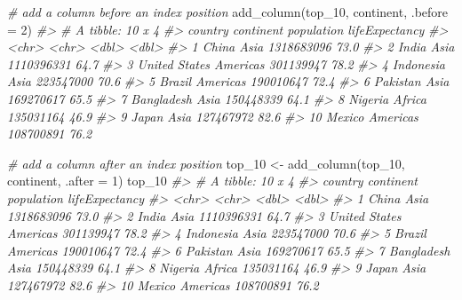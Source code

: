 \documentclass[
]{book}
\newenvironment{Shaded}{\begin{snugshade}}{\end{snugshade}}
\newcommand{\AttributeTok}[1]{\textcolor[rgb]{0.77,0.63,0.00}{#1}}
\newcommand{\CommentTok}[1]{\textcolor[rgb]{0.56,0.35,0.01}{\textit{#1}}}
\newcommand{\DecValTok}[1]{\textcolor[rgb]{0.00,0.00,0.81}{#1}}
\newcommand{\FunctionTok}[1]{\textcolor[rgb]{0.00,0.00,0.00}{#1}}
\newcommand{\NormalTok}[1]{#1}
\newcommand{\OtherTok}[1]{\textcolor[rgb]{0.56,0.35,0.01}{#1}}
\begin{document}
\begin{Shaded}
\begin{Highlighting}[]
\CommentTok{\# add a column before an index position}
\FunctionTok{add\_column}\NormalTok{(top\_10, continent, }\AttributeTok{.before =} \DecValTok{2}\NormalTok{)}
\CommentTok{\#\textgreater{} \# A tibble: 10 x 4}
\CommentTok{\#\textgreater{}    country       continent population lifeExpectancy}
\CommentTok{\#\textgreater{}    \textless{}chr\textgreater{}         \textless{}chr\textgreater{}          \textless{}dbl\textgreater{}          \textless{}dbl\textgreater{}}
\CommentTok{\#\textgreater{}  1 China         Asia      1318683096           73.0}
\CommentTok{\#\textgreater{}  2 India         Asia      1110396331           64.7}
\CommentTok{\#\textgreater{}  3 United States Americas   301139947           78.2}
\CommentTok{\#\textgreater{}  4 Indonesia     Asia       223547000           70.6}
\CommentTok{\#\textgreater{}  5 Brazil        Americas   190010647           72.4}
\CommentTok{\#\textgreater{}  6 Pakistan      Asia       169270617           65.5}
\CommentTok{\#\textgreater{}  7 Bangladesh    Asia       150448339           64.1}
\CommentTok{\#\textgreater{}  8 Nigeria       Africa     135031164           46.9}
\CommentTok{\#\textgreater{}  9 Japan         Asia       127467972           82.6}
\CommentTok{\#\textgreater{} 10 Mexico        Americas   108700891           76.2}

\CommentTok{\# add a column after an index position}
\NormalTok{top\_10 }\OtherTok{\textless{}{-}} \FunctionTok{add\_column}\NormalTok{(top\_10, continent, }\AttributeTok{.after =} \DecValTok{1}\NormalTok{)}
\NormalTok{top\_10}
\CommentTok{\#\textgreater{} \# A tibble: 10 x 4}
\CommentTok{\#\textgreater{}    country       continent population lifeExpectancy}
\CommentTok{\#\textgreater{}    \textless{}chr\textgreater{}         \textless{}chr\textgreater{}          \textless{}dbl\textgreater{}          \textless{}dbl\textgreater{}}
\CommentTok{\#\textgreater{}  1 China         Asia      1318683096           73.0}
\CommentTok{\#\textgreater{}  2 India         Asia      1110396331           64.7}
\CommentTok{\#\textgreater{}  3 United States Americas   301139947           78.2}
\CommentTok{\#\textgreater{}  4 Indonesia     Asia       223547000           70.6}
\CommentTok{\#\textgreater{}  5 Brazil        Americas   190010647           72.4}
\CommentTok{\#\textgreater{}  6 Pakistan      Asia       169270617           65.5}
\CommentTok{\#\textgreater{}  7 Bangladesh    Asia       150448339           64.1}
\CommentTok{\#\textgreater{}  8 Nigeria       Africa     135031164           46.9}
\CommentTok{\#\textgreater{}  9 Japan         Asia       127467972           82.6}
\CommentTok{\#\textgreater{} 10 Mexico        Americas   108700891           76.2}
\end{Highlighting}
\end{Shaded}
\end{document}

